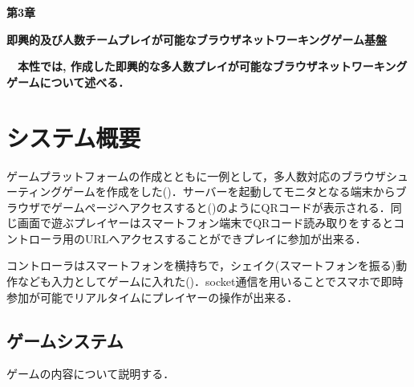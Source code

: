 \newpage
\setcounter{chapter}{3}
\setcounter{section}{0}

\begin{center}
    \vspace{0.5cm}
    \huge{\bf 第3章}
    \par
    \vspace{1cm}
    \hrulefill
    \par
    \vspace{1cm}
    \huge{\bf 即興的及び人数チームプレイが可能なブラウザネットワーキングゲーム基盤}
    \par
    \vspace{0.5cm}
    \hrulefill
    \vspace{1cm}
    \par

    \begin{flushleft}
        \large{{\bf　本性では, 作成した即興的な多人数プレイが可能なブラウザネットワーキングゲームについて述べる．}}
    \end{flushleft}
\end{center}


\newpage
\section{システム概要}
ゲームプラットフォームの作成とともに一例として，多人数対応のブラウザシューティングゲームを作成をした()．サーバーを起動してモニタとなる端末からブラウザでゲームページへアクセスすると()のようにQRコードが表示される．同じ画面で遊ぶプレイヤーはスマートフォン端末でQRコード読み取りをするとコントローラ用のURLへアクセスすることができプレイに参加が出来る．

コントローラはスマートフォンを横持ちで，シェイク(スマートフォンを振る)動作なども入力としてゲームに入れた()．socket通信を用いることでスマホで即時参加が可能でリアルタイムにプレイヤーの操作が出来る．


\subsection{ゲームシステム}
ゲームの内容について説明する．

